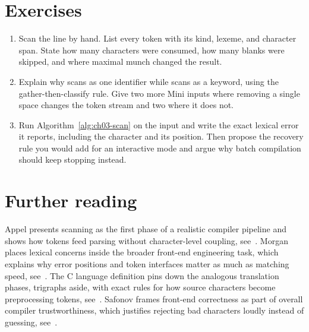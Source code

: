 \section{Exercises}
\label{sec:ch03-exercises}

\begin{enumerate}
\item \label{ex:ch03-scan-line} Scan the line  by hand. List every token with its kind, lexeme, and character span. State how many characters were consumed, how many blanks were skipped, and where maximal munch changed the result.
\item \label{ex:ch03-keyword-split} Explain why  scans as one identifier while  scans as a keyword, using the gather-then-classify rule. Give two more Mini inputs where removing a single space changes the token stream and two where it does not.
\item \label{ex:ch03-bad-char} Run Algorithm~\ref{alg:ch03-scan} on the input  and write the exact lexical error it reports, including the character and its position. Then propose the recovery rule you would add for an interactive mode and argue why batch compilation should keep stopping instead.
\end{enumerate}

\section{Further reading}
\label{sec:ch03-further-reading}

Appel presents scanning as the first phase of a realistic compiler pipeline and shows how tokens feed parsing without character-level coupling, see~\cite{appel-1998-modern}.
Morgan places lexical concerns inside the broader front-end engineering task, which explains why error positions and token interfaces matter as much as matching speed, see~\cite{morgan-1998-optimizing}.
The C language definition pins down the analogous translation phases, trigraphs aside, with exact rules for how source characters become preprocessing tokens, see~\cite{wg14-2011-c11}.
Safonov frames front-end correctness as part of overall compiler trustworthiness, which justifies rejecting bad characters loudly instead of guessing, see~\cite{safonov-2010-trustworthy}.
